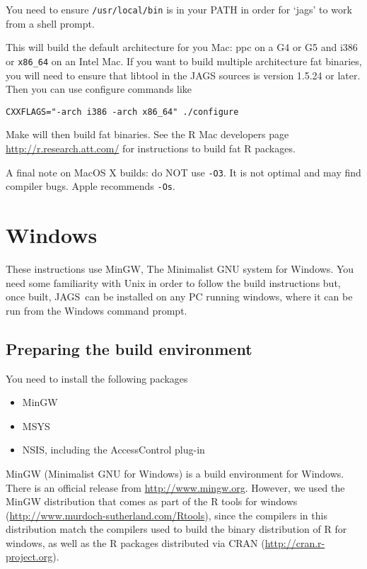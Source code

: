 \documentclass[11pt, a4paper, titlepage]{article}
\newcommand{\JAGS}{\textsf{JAGS}}
\begin{document}
You need to ensure \texttt{/usr/local/bin} is in your PATH in order
for `jags' to work from a shell prompt.

This will build the default architecture for you Mac: ppc on a G4 or
G5 and i386 or \verb+x86_64+ on an Intel Mac.  If you want to build
multiple architecture fat binaries, you will need to ensure that
libtool in the JAGS sources is version 1.5.24 or later.  Then you can
use configure commands like
\begin{verbatim}
CXXFLAGS="-arch i386 -arch x86_64" ./configure
\end{verbatim}

Make will then build fat binaries.  See the R Mac developers page 
\url{http://r.research.att.com/} for instructions to build fat R packages.

A final note on MacOS X builds: do NOT use \texttt{-O3}.  It is not optimal 
and may find compiler bugs.  Apple recommends \texttt{-Os}.

\clearpage
\section{Windows}
\label{section:windows}

These instructions use MinGW, The Minimalist GNU system for Windows.
You need some familiarity with Unix in order to follow the build
instructions but, once built, \JAGS\ can be installed on any PC
running windows, where it can be run from the Windows command prompt.

\subsection{Preparing the build environment}

You need to install the following packages
\begin{itemize}
\item MinGW 
\item MSYS  
\item NSIS, including the AccessControl plug-in  
\end{itemize}

MinGW (Minimalist GNU for Windows) is a build environment for Windows.
There is an official release from \url{http://www.mingw.org}.
However, we used the MinGW distribution that comes as part of the R
tools for windows (\url{http://www.murdoch-sutherland.com/Rtools}),
since the compilers in this distribution match the compilers used to
build the binary distribution of R for windows, as well as the R
packages distributed via CRAN (\url{http://cran.r-project.org}).
\end{document}

